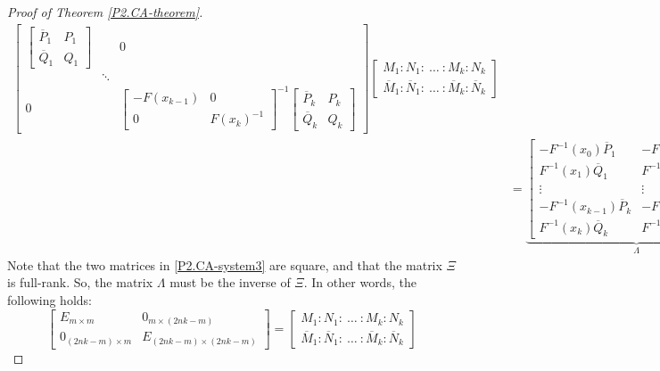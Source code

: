 \documentclass[10pt,reqno,oneside,a4paper]{article}
\begin{document}
\begin{proof}[Proof of Theorem \ref{P2.CA-theorem}]
\begin{align}
\begin{bmatrix}
\begin{bmatrix}
\overline{P}_1 & P_1 \\
\overline{Q}_1 & Q_1 
\end{bmatrix} & & 0 \\
& \ddots & \\
0 & & \begin{bmatrix}
-F(x_{k-1}) & 0 \\
0 & F(x_k) ^{-1}
\end{bmatrix}^{-1}
\begin{bmatrix}
\overline{P}_k & P_k \\
\overline{Q}_k & Q_k 
\end{bmatrix} 
\end{bmatrix} 
\begin{bmatrix}
M_1 : N_1 :~ \ldots ~: M_k : N_k \\
\overline{M}_1 : \overline{N}_1 :~ \ldots ~: \overline{M}_k : \overline{N}_k 
\end{bmatrix}
\nonumber \\
&= 
\underbrace{\begin{bmatrix}
-F^{-1}(x_0) \overline{P}_1 & -F^{-1}(x_0) P_1 \\
F^{-1}(x_1)\overline{Q}_1 & F^{-1}(x_1)Q_1  \\
\vdots & \vdots \\
-F^{-1}(x_{k-1})\overline{P}_k & -F^{-1}(x_{k-1})P_k \\
F^{-1}(x_k)\overline{Q}_k & F^{-1}(x_k)Q_k 
\end{bmatrix}}_\text{$\displaystyle \Lambda$}
\underbrace{\begin{bmatrix}
M_1 : N_1 :~ \ldots ~: M_k : N_k \\
\overline{M}_1 : \overline{N}_1 :~ \ldots ~: \overline{M}_k : \overline{N}_k 
\end{bmatrix}}_\text{$\displaystyle \Xi$}. \label{P2.CA-system3}
\end{align}
Note that the two matrices in \eqref{P2.CA-system3} are square, and that the matrix $\Xi$ is full-rank. So, the matrix $\Lambda$ must be the inverse of $\Xi.$ In other words, the following holds:
\[
\begin{bmatrix} 
E_{m \times m} & 0_{m \times (2nk-m)} \\ 0_{(2nk-m) \times m} & E_{(2nk-m) \times (2nk-m)}
\end{bmatrix} 
=
\begin{bmatrix}
M_1 : N_1 :~ \ldots ~: M_k : N_k \\
\overline{M}_1 : \overline{N}_1 :~ \ldots ~: \overline{M}_k : \overline{N}_k 
\end{bmatrix}
\]
\end{proof}
\end{document}
